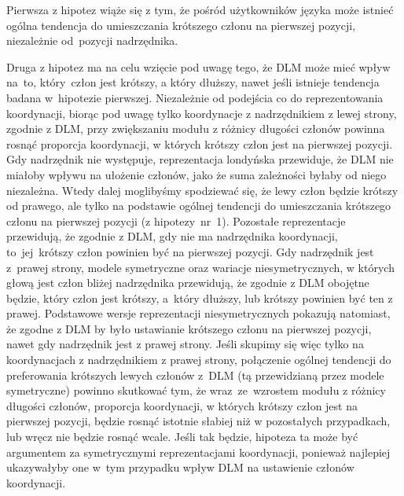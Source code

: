 \documentclass[licencjacka]{pracamgr_Kogni}
\begin{document}
    Pierwsza z hipotez wiąże się z tym, że pośród użytkowników języka może istnieć ogólna tendencja do umieszczania krótszego członu na pierwszej pozycji, niezależnie od~pozycji nadrzędnika.

    Druga z hipotez ma na celu wzięcie pod uwagę tego, że DLM może mieć wpływ na~to, który~człon jest krótszy, a który dłuższy, nawet jeśli istnieje tendencja badana w~hipotezie pierwszej.
    Niezależnie od podejścia co do reprezentowania koordynacji, biorąc pod uwagę tylko koordynacje z nadrzędnikiem z lewej strony, zgodnie z DLM, przy zwiększaniu modułu z różnicy długości członów powinna rosnąć proporcja koordynacji, w których krótszy człon jest na pierwszej pozycji.
    Gdy nadrzędnik nie występuje, reprezentacja londyńska przewiduje, że DLM nie miałoby wpływu na ułożenie członów, jako że suma zależności byłaby od niego niezależna.
    Wtedy dalej moglibyśmy spodziewać się, że lewy człon będzie krótszy od prawego, ale tylko na podstawie ogólnej tendencji do umieszczania krótszego członu na pierwszej pozycji (z hipotezy~nr~1).
    Pozostałe reprezentacje przewidują, że zgodnie z DLM, gdy nie ma nadrzędnika koordynacji, to~jej~krótszy człon powinien być na pierwszej pozycji.
    Gdy nadrzędnik jest z~prawej strony, modele symetryczne oraz wariacje niesymetrycznych, w których głową jest człon bliżej nadrzędnika przewidują, że zgodnie z DLM obojętne będzie, który człon jest krótszy, a~który dłuższy, lub krótszy powinien być ten z prawej. 
    Podstawowe wersje reprezentacji niesymetrycznych pokazują natomiast, że zgodne z DLM by było ustawianie krótszego członu na pierwszej pozycji, nawet gdy nadrzędnik jest z prawej strony.
    Jeśli skupimy się więc tylko na koordynacjach z nadrzędnikiem z prawej strony, połączenie ogólnej tendencji do preferowania krótszych lewych członów z~DLM (tą przewidzianą przez modele symetryczne) powinno skutkować tym, że wraz~ze~wzrostem modułu z różnicy długości członów, proporcja koordynacji, w których krótszy człon jest na pierwszej pozycji, będzie rosnąć istotnie słabiej niż w pozostałych przypadkach, lub wręcz nie będzie rosnąć wcale.
    Jeśli tak będzie, hipoteza ta może być argumentem za symetrycznymi reprezentacjami koordynacji, ponieważ najlepiej ukazywałyby one w~tym przypadku wpływ DLM na ustawienie członów koordynacji.
    \newpage
\end{document}
